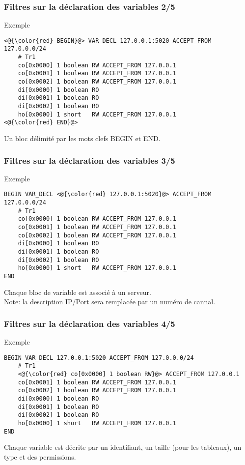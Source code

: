 \documentclass{beamer}
\begin{document}
\begin{frame}[fragile]
    \frametitle{Filtres sur la déclaration des variables 2/5}

    \begin{exampleblock}{Exemple}
        \begin{lstlisting}
<@{\color{red} BEGIN}@> VAR_DECL 127.0.0.1:5020 ACCEPT_FROM 127.0.0.0/24
    # Tr1
    co[0x0000] 1 boolean RW ACCEPT_FROM 127.0.0.1
    co[0x0001] 1 boolean RW ACCEPT_FROM 127.0.0.1
    co[0x0002] 1 boolean RW ACCEPT_FROM 127.0.0.1
    di[0x0000] 1 boolean RO
    di[0x0001] 1 boolean RO
    di[0x0002] 1 boolean RO
    ho[0x0000] 1 short   RW ACCEPT_FROM 127.0.0.1
<@{\color{red} END}@>
        \end{lstlisting}
    \end{exampleblock}
    \vfill
    Un bloc délimité par les mots clefs {\color{red} BEGIN} et {\color{red} END}.
\end{frame}

\begin{frame}[fragile]
    \frametitle{Filtres sur la déclaration des variables 3/5}

    \begin{exampleblock}{Exemple}
        \begin{lstlisting}
BEGIN VAR_DECL <@{\color{red} 127.0.0.1:5020}@> ACCEPT_FROM 127.0.0.0/24
    # Tr1
    co[0x0000] 1 boolean RW ACCEPT_FROM 127.0.0.1
    co[0x0001] 1 boolean RW ACCEPT_FROM 127.0.0.1
    co[0x0002] 1 boolean RW ACCEPT_FROM 127.0.0.1
    di[0x0000] 1 boolean RO
    di[0x0001] 1 boolean RO
    di[0x0002] 1 boolean RO
    ho[0x0000] 1 short   RW ACCEPT_FROM 127.0.0.1
END
        \end{lstlisting}
    \end{exampleblock}
    \vfill
    Chaque bloc de variable est associé à un serveur.\\
    Note: la description IP/Port sera remplacée par un numéro de cannal.
\end{frame}

\begin{frame}[fragile]
    \frametitle{Filtres sur la déclaration des variables 4/5}

    \begin{exampleblock}{Exemple}
        \begin{lstlisting}
BEGIN VAR_DECL 127.0.0.1:5020 ACCEPT_FROM 127.0.0.0/24
    # Tr1
    <@{\color{red} co[0x0000] 1 boolean RW}@> ACCEPT_FROM 127.0.0.1
    co[0x0001] 1 boolean RW ACCEPT_FROM 127.0.0.1
    co[0x0002] 1 boolean RW ACCEPT_FROM 127.0.0.1
    di[0x0000] 1 boolean RO
    di[0x0001] 1 boolean RO
    di[0x0002] 1 boolean RO
    ho[0x0000] 1 short   RW ACCEPT_FROM 127.0.0.1
END
        \end{lstlisting}
    \end{exampleblock}
    \vfill
    Chaque variable est décrite par un identifiant, un taille (pour les tableaux), un type et des permissions.
\end{frame}
\end{document}
